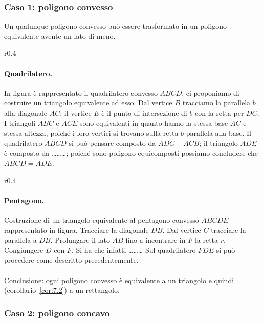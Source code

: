 \subsubsection{Caso 1: poligono convesso}
Un qualunque poligono convesso può essere trasformato in un poligono 
equivalente avente un lato di meno.

\begin{wrapfigure}{r}{0.4\textwidth}
	\centering
\end{wrapfigure}
\paragraph{Quadrilatero.}
In figura è rappresentato il quadrilatero convesso \(ABCD\), ci 
proponiamo di costruire un triangolo equivalente ad esso. Dal vertice 
\(B\) tracciamo la parallela \(b\) alla diagonale \(AC\); il vertice \(E\) 
è 
il punto di intersezione di \(b\) con la retta per \(DC\). I triangoli 
\(ABC\) e \(ACE\) sono equivalenti in quanto hanno la stessa base \(AC\) e 
stessa altezza, poiché i loro vertici si trovano sulla retta \(b\) 
parallela alla base. Il quadrilatero \(ABCD\) si può pensare composto 
da \(ADC + ACB\); il triangolo \(ADE\) è composto da 
\ldots\ldots\ldots{}; poiché sono poligono equicomposti possiamo 
concludere che \(ABCD\doteq ADE\).

\begin{wrapfigure}{r}{0.4\textwidth}
	\centering
\end{wrapfigure}
\paragraph{Pentagono.}
Costruzione di un triangolo equivalente al pentagono convesso \(ABCDE\) 
rappresentato in figura.
Tracciare la diagonale \(DB\).
Dal vertice \(C\) tracciare la parallela a \(DB\).
Prolungare il lato \(AB\) fino a incontrare in \(F\) la retta \(r\).
Congiungere \(D\) con \(F\).
Si ha che  infatti \ldots\ldots\ldots{} 
Sul quadrilatero \(FDE\) si può procedere come descritto 
precedentemente.

\paragraph*{}
Conclusione: ogni poligono convesso è equivalente a un triangolo e 
quindi (corollario~\ref{cor:7.2}) a un rettangolo.

\subsubsection{Caso 2: poligono concavo}

